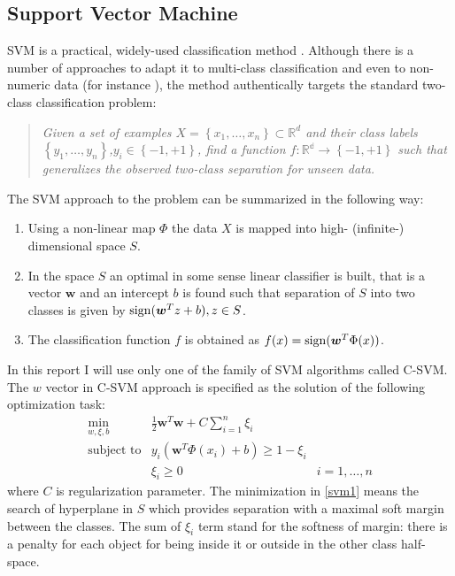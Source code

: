 \subsection{Support Vector Machine}

SVM is a practical, widely-used classification method \cite{cortes1995support}. Although there is a number of approaches to adapt it to multi-class classification and even to non-numeric data (for instance \cite{lodhi2002text}), the method authentically targets the standard two-class classification problem:

\begin{quotation}
\textit{Given a set of examples $X=\left\{ x_1, \ldots, x_n\right\} \subset \mathbb{R}^{d}$ and their class labels~$\left\{y_1,\ldots,y_n\right\}$,$y_i \in \left\{-1, +1\right\}$, find a function $f: \mathbb{R^d}\rightarrow \left\{-1, +1\right\}$ such that generalizes the observed two-class separation for unseen data.}
\end{quotation} 
The SVM approach to the problem can be summarized in the following way:
\begin{enumerate}
\item
Using a non-linear map $\Phi$ the data $X$ is mapped into high- (infinite-) dimensional space $S$.
\item
In the space $S$ an optimal in some sense linear classifier is built, that is a vector $\bm{w}$ and an intercept $b$ is found such that separation of $S$ into two classes is given by $\operatorname{sign}(\bm{w}^T z + b), z \in S$.
\item
The classification function $f$ is obtained as $f(x) = \operatorname{sign}(\bm{w}^T \Phi(x))$.
\end{enumerate}
In this report I will use only one of the family of SVM algorithms called C-SVM. The $w$ vector in C-SVM approach is specified as the solution of the following optimization task:
\begin{equation}
\begin{array}{ccc}
\underset{w,\xi,b}{\min} &
\frac{1}{2}\bm{w}^T \bm{w} + C\sum\limits_{i=1}^n \xi_i \\
\textrm{subject to} & y_i(\bm{w}^T \Phi(x_i) + b) \geq 1 - \xi_i \\
& \xi_i \geq 0 & i=1,\ldots,n
\end{array}
\label{svm1}
\end{equation}
where $C$ is regularization parameter. The minimization in \ref{svm1} means the search of hyperplane in $S$ which provides separation with a maximal soft margin between the classes. The sum of $\xi_i$ term stand for the softness of margin: there is a penalty for each object for being inside it or outside in the other class half-space.

